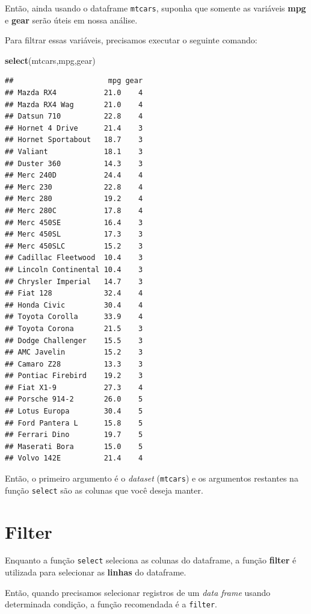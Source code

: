 \documentclass[
]{book}
\newenvironment{Shaded}{\begin{snugshade}}{\end{snugshade}}
\newcommand{\KeywordTok}[1]{\textcolor[rgb]{0.13,0.29,0.53}{\textbf{#1}}}
\newcommand{\NormalTok}[1]{#1}
\begin{document}
Então, ainda usando o dataframe \texttt{mtcars}, suponha que somente as
variáveis \textbf{mpg} e \textbf{gear} serão úteis em nossa análise.

Para filtrar essas variáveis, precisamos executar o seguinte comando:

\begin{Shaded}
\begin{Highlighting}[]
\KeywordTok{select}\NormalTok{(mtcars,mpg,gear)}
\end{Highlighting}
\end{Shaded}

\begin{verbatim}
##                      mpg gear
## Mazda RX4           21.0    4
## Mazda RX4 Wag       21.0    4
## Datsun 710          22.8    4
## Hornet 4 Drive      21.4    3
## Hornet Sportabout   18.7    3
## Valiant             18.1    3
## Duster 360          14.3    3
## Merc 240D           24.4    4
## Merc 230            22.8    4
## Merc 280            19.2    4
## Merc 280C           17.8    4
## Merc 450SE          16.4    3
## Merc 450SL          17.3    3
## Merc 450SLC         15.2    3
## Cadillac Fleetwood  10.4    3
## Lincoln Continental 10.4    3
## Chrysler Imperial   14.7    3
## Fiat 128            32.4    4
## Honda Civic         30.4    4
## Toyota Corolla      33.9    4
## Toyota Corona       21.5    3
## Dodge Challenger    15.5    3
## AMC Javelin         15.2    3
## Camaro Z28          13.3    3
## Pontiac Firebird    19.2    3
## Fiat X1-9           27.3    4
## Porsche 914-2       26.0    5
## Lotus Europa        30.4    5
## Ford Pantera L      15.8    5
## Ferrari Dino        19.7    5
## Maserati Bora       15.0    5
## Volvo 142E          21.4    4
\end{verbatim}

Então, o primeiro argumento é o \emph{dataset} (\texttt{mtcars}) e os
argumentos restantes na função \texttt{select} são as colunas que você
deseja manter.

\hypertarget{filter}{%
\section{Filter}\label{filter}}

Enquanto a função \texttt{select} seleciona as colunas do dataframe, a
função \textbf{filter} é utilizada para selecionar as \textbf{linhas} do
dataframe.

Então, quando precisamos selecionar registros de um \emph{data frame}
usando determinada condição, a função recomendada é a \texttt{filter}.
\end{document}
